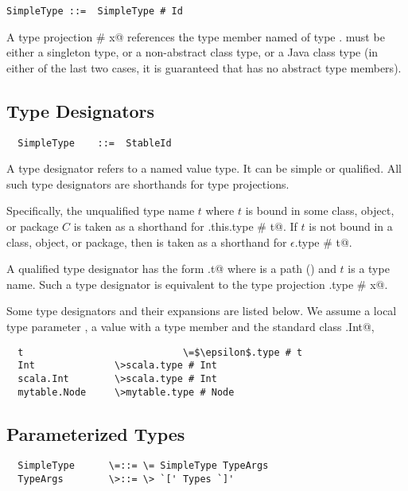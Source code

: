 \documentclass[11pt]{report}
\begin{document}
\syntax\begin{verbatim} 
SimpleType ::=  SimpleType # Id
\end{verbatim}

A type projection \verb@T # x@ references the type member named 
\verb@x@ of type \verb@T@. \verb@T@ must be either a singleton type,
or a non-abstract class type, or a Java class type (in either of the
last two cases, it is guaranteed that \verb@T@ has no abstract type
members).

\subsection{Type Designators}
\label{sec:type-desig}

\syntax\begin{verbatim}
  SimpleType   	::=  StableId
\end{verbatim}

A type designator refers to a named value type. It can be simple or
qualified. All such type designators are shorthands for type projections.

Specifically, the unqualified type name $t$ where $t$ is bound in some
class, object, or package $C$ is taken as a shorthand for
\verb@C.this.type # t@.  If $t$ is not bound in a class, object, or
package, then \verb@t@ is taken as a shorthand for
\verb@$\epsilon$.type # t@.

A qualified type designator has the form \verb@p.t@ where \verb@p@ is
a path (\sref{}) and $t$ is a type name. Such a type designator is
equivalent to the type projection \verb@p.type # x@.

\example 
Some type designators and their expansions are listed below. We assume
a local type parameter \verb@t@, a value \verb@mytable@
with a type member \verb@Node@ and the standard class \verb@scala.Int@, 
\begin{verbatim}
  t                            \=$\epsilon$.type # t
  Int              \>scala.type # Int
  scala.Int        \>scala.type # Int
  mytable.Node     \>mytable.type # Node
\end{verbatim}

\subsection{Parameterized Types}
\label{sec:param-types}

\syntax\begin{verbatim}
  SimpleType      \=::= \= SimpleType TypeArgs
  TypeArgs        \>::= \> `[' Types `]'
\end{verbatim}
\end{document}
